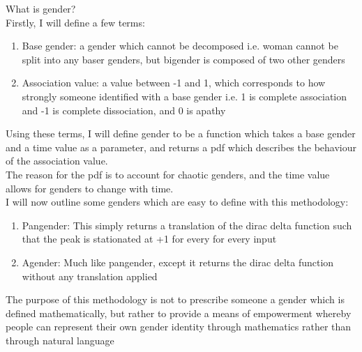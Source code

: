 \documentclass[20pt, a4]{article}
\begin{document}
What is gender? \\
Firstly, I will define a few terms:
\begin{enumerate}
	\item Base gender: a gender which cannot be decomposed i.e. woman cannot be split into any baser genders, but bigender is composed of two other genders
	\item Association value: a value between -1 and 1, which corresponds to how strongly someone identified with a base gender i.e. 1 is complete association and -1 is complete dissociation, and 0 is apathy
\end{enumerate}
Using these terms, I will define gender to be a function which takes a base gender and a time value as a parameter, and returns a pdf which describes the behaviour of the association value. \\
The reason for the pdf is to account for chaotic genders, and the time value allows for genders to change with time. \\
I will now outline some genders which are easy to define with this methodology:
\begin{enumerate}
	\item Pangender: This simply returns a translation of the dirac delta function such that the peak is stationated at +1 for every for every input
	\item Agender: Much like pangender, except it returns the dirac delta function without any translation applied
\end{enumerate}
The purpose of this methodology is not to prescribe someone a gender which is defined mathematically, but rather to provide a means of empowerment whereby people can represent their own gender identity through mathematics rather than through natural language
\end{document}
